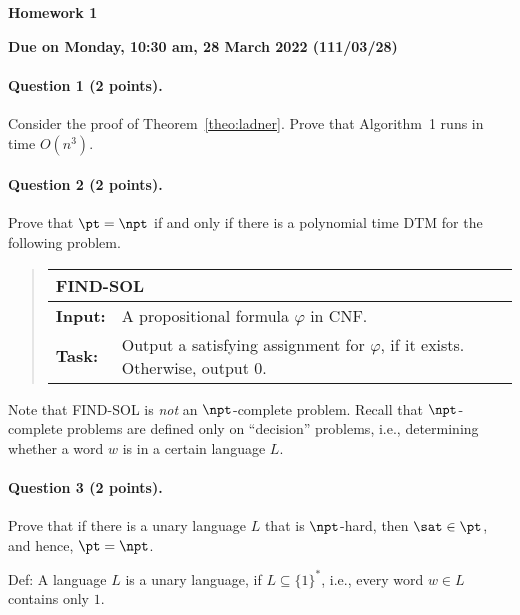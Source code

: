 \documentclass[11pt, a4paper]{article}
\renewcommand{\lessontitle}{Homework 1}
\renewcommand{\fulltitle}{\lessontitle}
\begin{document}
\date{}



\begin{center}
{\Large {\bf \fulltitle}}
\end{center}
\begin{center}
{\Large {\bf Due on Monday, 10:30 am, 28 March 2022 (111/03/28)}}
\end{center}


\vspace{0.5cm}

\paragraph*{Question 1 (2 points).}
Consider the proof of Theorem~\ref{theo:ladner}.
Prove that Algorithm~1 runs in time $O(n^3)$.



\paragraph*{Question 2 (2 points).}
Prove that $\pt=\npt$ if and only if there is a polynomial time DTM for the following problem.

\begin{quote}
{\def\arraystretch{1.25}
\begin{tabular}{|ll|}
\hline
\multicolumn{2}{|l|}{{\sf FIND-SOL}}
\\
\hline
{\bf Input:}
&
A propositional formula $\varphi$ in CNF.
\\
{\bf Task:}
&
Output a satisfying assignment for $\varphi$, if it exists. 
Otherwise, output $0$.
\\
\hline
\end{tabular}}
\end{quote}
Note that {\sf FIND-SOL} is {\em not} an $\npt$-complete problem.
Recall that $\npt$-complete problems are defined only on ``decision'' problems,
i.e., determining whether a word $w$ is in a certain language $L$.


\paragraph*{Question 3 (2 points).}
Prove that if there is a unary language $L$ that is $\npt$-hard,
then $\sat \in \pt$, and hence, $\pt=\npt$.

Def: A language $L$ is a unary language, if $L \subseteq \{1\}^*$, i.e., every word $w\in L$ contains only $1$.
\end{document}
